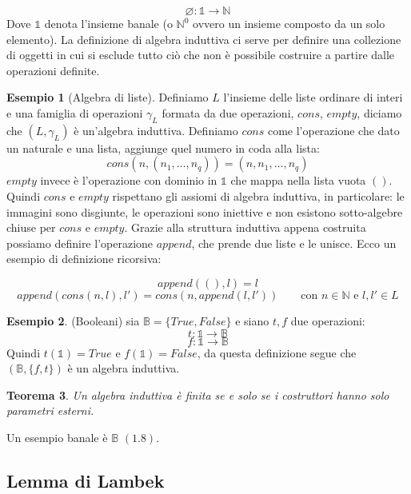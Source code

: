 \documentclass{article}
\newtheorem{theorem}{Teorema}[section]
\theoremstyle{definition}
\theoremstyle{definition}
\theoremstyle{definition}
\newtheorem{example}[theorem]{Esempio}
\theoremstyle{remark}
\begin{document}
$$\varnothing: \mathds{1}\to\mathbb{N} $$
Dove $\mathds{1}$ denota l'insieme banale (o $\mathbb{N}^0$ ovvero un insieme composto da un solo elemento). La definizione di algebra induttiva ci serve per definire una collezione di oggetti in cui si esclude tutto ciò che non è
possibile costruire a partire dalle operazioni definite.
\begin{example}[Algebra di liste]
    Definiamo $L$ l'insieme delle liste ordinare di interi e una famiglia di operazioni $\gamma_L$ formata da due operazioni, $cons$, $empty$, diciamo che $(L,\gamma_L)$ è un'algebra induttiva. Definiamo $cons$ come l'operazione che dato un naturale e una lista, aggiunge quel numero in coda alla lista:
    $$cons(n,(n_1,\dots,n_q)) = (n,n_1,\dots,n_q)$$
    $empty$ invece è l'operazione con dominio in $\mathds{1}$ che mappa nella lista vuota $()$. Quindi $cons$ e $empty$ rispettano gli assiomi di algebra induttiva, in particolare: le immagini sono disgiunte, le operazioni sono iniettive e non esistono sotto-algebre chiuse per $cons$ e $empty$.
    Grazie alla struttura induttiva appena costruita possiamo  definire l'operazione $append$, che prende due liste e le unisce. Ecco un esempio di definizione ricorsiva:

    $$append((),l) = l$$
    $$append(cons(n,l),l') = cons(n,append(l,l'))\qquad\text{con $n\in\mathbb{N}$ e $l,l'\in L$}$$


\end{example}
\begin{example}(Booleani) sia $\mathbb{B} = \{True,False\}$ e siano $t,f$ due operazioni:
    $$ t:\mathds{1}\to\mathbb{B}$$
    $$ f:\mathds{1}\to\mathbb{B}$$
    Quindi $t(\mathds{1}) = True$ e $f(\mathds{1}) = False$, da questa definizione segue che  $(\mathbb{B},\{f,t\})$ è un algebra induttiva.
\end{example}
\begin{theorem}
    Un algebra induttiva è finita se e solo se  i costruttori hanno solo parametri esterni.
\end{theorem}
Un esempio banale  è $\mathbb{B}$ $( 1.8)$.
\subsection{Lemma di Lambek}
\end{document}
